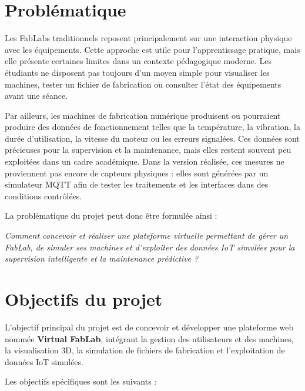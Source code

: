 \section{Problématique}

Les FabLabs traditionnels reposent principalement sur une interaction physique avec les équipements. Cette approche est utile pour l’apprentissage pratique, mais elle présente certaines limites dans un contexte pédagogique moderne. Les étudiants ne disposent pas toujours d’un moyen simple pour visualiser les machines, tester un fichier de fabrication ou consulter l’état des équipements avant une séance.

Par ailleurs, les machines de fabrication numérique produisent ou pourraient produire des données de fonctionnement telles que la température, la vibration, la durée d’utilisation, la vitesse du moteur ou les erreurs signalées. Ces données sont précieuses pour la supervision et la maintenance, mais elles restent souvent peu exploitées dans un cadre académique. Dans la version réalisée, ces mesures ne proviennent pas encore de capteurs physiques : elles sont générées par un simulateur MQTT afin de tester les traitements et les interfaces dans des conditions contrôlées.

La problématique du projet peut donc être formulée ainsi :

\begin{center}
\textit{Comment concevoir et réaliser une plateforme virtuelle permettant de gérer un FabLab, de simuler ses machines et d’exploiter des données IoT simulées pour la supervision intelligente et la maintenance prédictive ?}
\end{center}

\section{Objectifs du projet}

L’objectif principal du projet est de concevoir et développer une plateforme web nommée \textbf{Virtual FabLab}, intégrant la gestion des utilisateurs et des machines, la visualisation 3D, la simulation de fichiers de fabrication et l’exploitation de données IoT simulées.

Les objectifs spécifiques sont les suivants :

